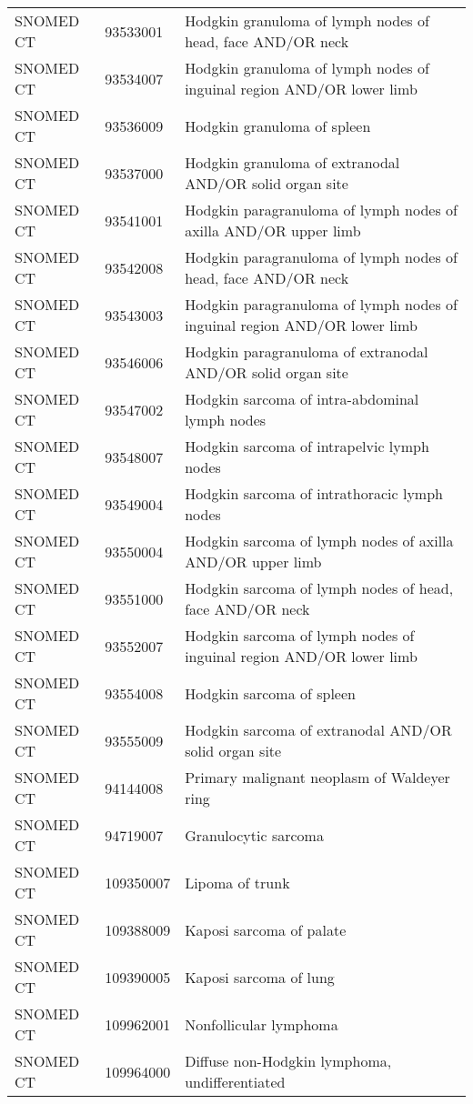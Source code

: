 \begin{longtable}{p{}p{}p{}}
  SNOMED CT & 93533001 & Hodgkin granuloma of lymph nodes of head, face AND/OR neck \\ 
  SNOMED CT & 93534007 & Hodgkin granuloma of lymph nodes of inguinal region AND/OR lower limb \\ 
  SNOMED CT & 93536009 & Hodgkin granuloma of spleen \\ 
  SNOMED CT & 93537000 & Hodgkin granuloma of extranodal AND/OR solid organ site \\ 
  SNOMED CT & 93541001 & Hodgkin paragranuloma of lymph nodes of axilla AND/OR upper limb \\ 
  SNOMED CT & 93542008 & Hodgkin paragranuloma of lymph nodes of head, face AND/OR neck \\ 
  SNOMED CT & 93543003 & Hodgkin paragranuloma of lymph nodes of inguinal region AND/OR lower limb \\ 
  SNOMED CT & 93546006 & Hodgkin paragranuloma of extranodal AND/OR solid organ site \\ 
  SNOMED CT & 93547002 & Hodgkin sarcoma of intra-abdominal lymph nodes \\ 
  SNOMED CT & 93548007 & Hodgkin sarcoma of intrapelvic lymph nodes \\ 
  SNOMED CT & 93549004 & Hodgkin sarcoma of intrathoracic lymph nodes \\ 
  SNOMED CT & 93550004 & Hodgkin sarcoma of lymph nodes of axilla AND/OR upper limb \\ 
  SNOMED CT & 93551000 & Hodgkin sarcoma of lymph nodes of head, face AND/OR neck \\ 
  SNOMED CT & 93552007 & Hodgkin sarcoma of lymph nodes of inguinal region AND/OR lower limb \\ 
  SNOMED CT & 93554008 & Hodgkin sarcoma of spleen \\ 
  SNOMED CT & 93555009 & Hodgkin sarcoma of extranodal AND/OR solid organ site \\ 
  SNOMED CT & 94144008 & Primary malignant neoplasm of Waldeyer ring \\ 
  SNOMED CT & 94719007 & Granulocytic sarcoma \\ 
  SNOMED CT & 109350007 & Lipoma of trunk \\ 
  SNOMED CT & 109388009 & Kaposi sarcoma of palate \\ 
  SNOMED CT & 109390005 & Kaposi sarcoma of lung \\ 
  SNOMED CT & 109962001 & Nonfollicular lymphoma \\ 
  SNOMED CT & 109964000 & Diffuse non-Hodgkin lymphoma, undifferentiated \\ 

\end{longtable}

